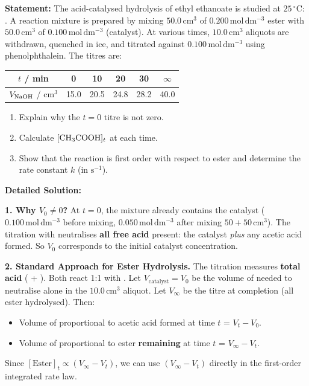 \documentclass[11pt]{article}
\begin{document}
\begin{exoresolu}
\textbf{Statement:} The acid-catalysed hydrolysis of ethyl ethanoate is studied at $25\,^\circ\mathrm{C}$:
.
A reaction mixture is prepared by mixing $50.0\,\mathrm{cm}^3$ of $0.200\,\mathrm{mol\,dm^{-3}}$ ester with $50.0\,\mathrm{cm}^3$ of $0.100\,\mathrm{mol\,dm^{-3}}$  (catalyst). At various times, $10.0\,\mathrm{cm}^3$ aliquots are withdrawn, quenched in ice, and titrated against $0.100\,\mathrm{mol\,dm^{-3}}$  using phenolphthalein. The titres are:

\begin{center}
\begin{tabular}{|c|c|c|c|c|c|}\hline
$t$ / min & 0 & 10 & 20 & 30 & $\infty$ \\ \hline
$V_{\ce{NaOH}}$ / $\mathrm{cm}^3$ & 15.0 & 20.5 & 24.8 & 28.2 & 40.0 \\ \hline
\end{tabular}
\end{center}

\begin{enumerate}
    \item Explain why the $t=0$ titre is not zero.
    \item Calculate $[\ce{CH3COOH}]_t$ at each time.
    \item Show that the reaction is first order with respect to ester and determine the rate constant $k$ (in $\mathrm{s^{-1}}$).
\end{enumerate}

\tcblower
\textbf{Detailed Solution:}

\textbf{1. Why $V_0 \neq 0$?}
At $t=0$, the mixture already contains the catalyst  ($0.100\,\mathrm{mol\,dm^{-3}}$ before mixing, $0.050\,\mathrm{mol\,dm^{-3}}$ after mixing $50+50\,\mathrm{cm}^3$). The titration with  neutralises \textbf{all free acid} present: the catalyst  \emph{plus} any acetic acid formed. So $V_0$ corresponds to the initial catalyst concentration.

\textbf{2. Standard Approach for Ester Hydrolysis.}
The titration measures \textbf{total acid} ( + ). Both react 1:1 with .
Let $V_{\text{catalyst}} = V_0$ be the volume of  needed to neutralise  alone in the $10.0\,\mathrm{cm}^3$ aliquot.
Let $V_\infty$ be the titre at completion (all ester hydrolysed).
Then:
\begin{itemize}
    \item Volume of  proportional to acetic acid formed at time $t$ = $V_t - V_0$.
    \item Volume of  proportional to ester \textbf{remaining} at time $t$ = $V_\infty - V_t$.
\end{itemize}
Since $[\text{Ester}]_t \propto (V_\infty - V_t)$, we can use $(V_\infty - V_t)$ directly in the first-order integrated rate law.


\end{exoresolu}
\end{document}
